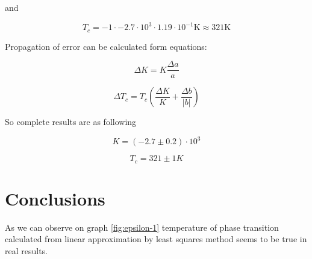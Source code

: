 \documentclass[a4paper,12pt]{article}
\begin{document}
    and 

    \begin{displaymath}
        T_c = -1 \cdot -2.7 \cdot 10^3 \cdot 1.19 \cdot 10^{-1} \mathrm{K} \approx 321 \mathrm{K}
    \end{displaymath}

    Propagation of error can be calculated form equations: 

    \begin{equation}
        \Delta K = K \frac{\Delta a}{a}
    \end{equation}
    
    \begin{equation}
        \Delta T_c = T_c \left( \frac{\Delta K}{K} + \frac{\Delta b}{|b|} \right)
    \end{equation}
    
    So complete results are as following

    \begin{displaymath}
        K = (-2.7 \pm 0.2) \cdot 10^3
    \end{displaymath}
    
    \begin{displaymath}
        T_c = 321 \pm 1 K
    \end{displaymath}
    


    \section{Conclusions}

    As we can observe on graph \ref{fig:epsilon-1} temperature of phase transition calculated from linear approximation by least squares method seems to be true in real results. 
\end{document}
